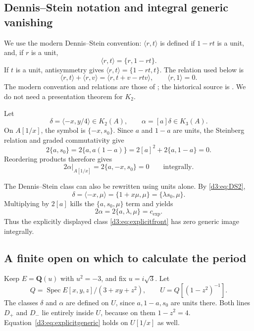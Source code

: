\documentclass[11pt,a4paper]{amsart}
\numberwithin{equation}{section}
\theoremstyle{definition}
\theoremstyle{remark}
\newcommand{\Q}{\mathbf Q}
\newcommand{\Spec}{\operatorname{Spec}}
\begin{document}
\subsection{Dennis--Stein notation and integral generic vanishing}
We use the modern Dennis--Stein convention: $\langle r,t\rangle$ is defined if $1-rt$ is a unit, and, if $r$ is a unit,
\[
\langle r,t\rangle=\{r,1-rt\}.
\]
If $t$ is a unit, antisymmetry gives $\langle r,t\rangle=\{1-rt,t\}$. The relation used below is
\begin{equation}\label{d3:eq:DS2}
\langle r,t\rangle+\langle r,v\rangle
=\langle r,t+v-rtv\rangle,
\qquad \langle r,1\rangle=0.
\end{equation}
The modern convention and relations are those of \cite[III, Definition~5.11 and (D1)--(D3)]{Weibel}; the historical source is \cite{DennisStein}. We do not need a presentation theorem for $K_2$.

Let
\[
\delta=\langle -x,y/4\rangle\in K_2(A),\qquad
\alpha=[a]\delta\in K_3(A).
\]
On $A[1/x]$, the symbol is $\{-x,s_0\}$. Since $a$ and $1-a$ are units, the Steinberg relation and graded commutativity give
\[
2\{a,s_0\}=2\{a,a(1-a)\}
=2[a]^2+2\{a,1-a\}=0.
\]
Reordering products therefore gives
\begin{equation}\label{d3:eq:explicitgeneric}
2\alpha|_{A[1/x]}=2\{a,-x,s_0\}=0
\qquad\text{integrally}.
\end{equation}

The Dennis--Stein class can also be rewritten using units alone. By \eqref{d3:eq:DS2},
\[
\delta=\langle -x,\mu\rangle=\{1+x\mu,\mu\}
=\{\lambda s_0,\mu\}.
\]
Multiplying by $2[a]$ kills the $\{a,s_0,\mu\}$ term and yields
\begin{equation}\label{d3:eq:explicitDS}
2\alpha=2\{a,\lambda,\mu\}=c_{\mathrm{exp}}.
\end{equation}
Thus the explicitly displayed class \eqref{d3:eq:explicitfront} has zero generic image integrally.

\subsection{A finite open on which to calculate the period}
Keep $E=\Q(u)$ with $u^2=-3$, and fix $u=i\sqrt3$. Let
\[
Q=\Spec E[x,y,z]/(3+xy+z^2),\qquad
U=Q[(1-z^2)^{-1}].
\]
The classes $\delta$ and $\alpha$ are defined on $U$, since $a,1-a,s_0$ are units there. Both lines $D_+$ and $D_-$ lie entirely inside $U$, because on them $1-z^2=4$. Equation~\eqref{d3:eq:explicitgeneric} holds on $U[1/x]$ as well.
\end{document}
